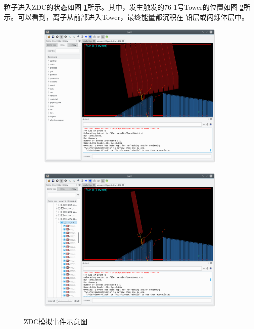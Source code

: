 \documentclass[bachelor,openany,oneside,color]{buaathesis}
\begin{document}
粒子进入ZDC的状态如图
\ref{fig:result:ZDC:Display}所示。其中，发生触发的76-1号Tower的位置如图
\ref{fig:result:ZDC:Tower}所示。可以看到，离子从前部进入Tower，最终能量都沉积在
铅层或闪烁体层中。
\begin{figure}
	\centering
	\begin{subfigure}{0.8\textwidth}
		\includegraphics[width=\textwidth]{./resource/ZDC-Display.png}
		\label{fig:result:ZDC:Display}
	\end{subfigure}
	\begin{subfigure}{0.8\textwidth}
		\includegraphics[width=\textwidth]{./resource/ZDC-Tower.png}
		\label{fig:result:ZDC:Tower}
	\end{subfigure}
	\caption{ZDC模拟事件示意图}
	\label{fig:result:ZDC}
\end{figure}
\end{document}
